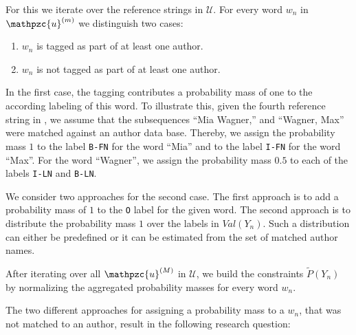For this we iterate over the reference strings in $\mathcal{U}$.
For every word $w_n$ in $\mathpzc{u}^{(m)}$ we distinguish two cases:
\begin{enumerate}
  \item $w_n$ is tagged as part of at least one author.
  \item $w_n$ is not tagged as part of at least one author.
\end{enumerate}

In the first case, the tagging contributes a probability mass of one to the according labeling of this word.
To illustrate this, given the fourth reference string in , we assume that the subsequences ``Mia Wagner,{}'' and ``Wagner, Max'' were matched against an author data base.
Thereby, we assign the probability mass $1$ to the label \texttt{B-FN} for the word ``Mia'' and to the label \texttt{I-FN} for the word ``Max''.
For the word ``Wagner'', we assign the probability mass $0.5$ to each of the labels \texttt{I-LN} and \texttt{B-LN}.

We consider two approaches for the second case.
The first approach is to add a probability mass of $1$ to the \texttt{O} label for the given word.
The second approach is to distribute the probability mass $1$ over the labels in $\mathit{Val}(Y_n)$.
Such a distribution can either be predefined or it can be estimated from the set of matched author names.

After iterating over all $\mathpzc{u}^{(M)}$ in $\mathcal{U}$, we build the constraints $\tilde{P}(Y_n)$ by normalizing the aggregated probability masses for every word $w_n$.

\bigskip

The two different approaches for assigning a probability mass to a $w_n$, that was not matched to an author, result in the following research question:
\newcommand\researchquestionthree{}
\researchquestionthree%

\bigskip

